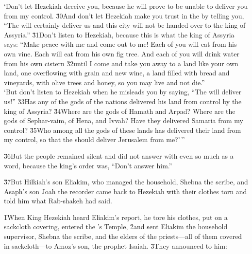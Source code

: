 \begin{poetry}
\poeml `Don't let Hezekiah deceive you, because he will prove to be unable to deliver you from my control. \v{30}And don't let Hezekiah make you trust in the  by telling you, ``The  will certainly deliver us and this city will not be handed over to the king of Assyria.'' \v{31}Don't listen to Hezekiah, because this is what the king of Assyria says: ``Make peace with me and come out to me! Each of you will eat from his own vine. Each will eat from his own fig tree. And each of you will drink water from his own cistern \v{32}until I come and take you away to a land like your own land, one overflowing with grain and new wine, a land filled with bread and vineyards, with olive trees and honey, so you may live and not die.'' \\
\poeml `But don't listen to Hezekiah when he misleads you by saying, ``The  will deliver us!'' \v{33}Has any of the gods of the nations delivered his land from control by the king of Assyria? \v{34}Where are the gods of Hamath and Arpad? Where are the gods of Sephar-vaim, of Hena, and Ivvah? Have they delivered Samaria from my control? \v{35}Who among all the gods of these lands has delivered their land from my control, so that the  should deliver Jerusalem from me?'\,''
\end{poetry}

\v{36}But the people remained silent and did not answer with even so much as a word, because the king's order was, ``Don't answer him.''

\v{37}But Hilkiah's son Eliakim, who managed the household, Shebna the scribe, and Asaph's son Joah the recorder came back to Hezekiah with their clothes torn and told him what Rab-shakeh had said.

\v{1}When King Hezekiah heard Eliakim's report, he tore his clothes, put on a sackcloth covering, entered the 's Temple, \v{2}and sent Eliakim the household supervisor, Shebna the scribe, and the elders of the priests---all of them covered in sackcloth---to Amoz's son, the prophet Isaiah. \v{3}They announced to him:

